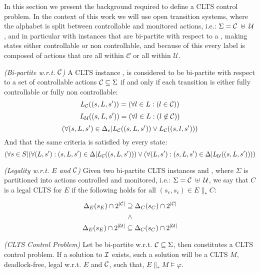 In this section we present the background required to define a CLTS control problem.  In the context of this work we will use open transition systems, where the alphabet is split between controllable and monitored actions, i.e.: $\Sigma=\mathcal{C} \; \uplus \;\mathcal{U}$, and in particular with instances that are bi-partite with respect to a \controlSet, making states either controllable or non controllable, and because of this every label is composed of actions that are all within $\mathcal{C}$ or all within $\mathcal{U}$. 

\begin{definition}\label{def:bi-partite_clts} \emph{(Bi-partite w.r.t. $\mathcal{C}$)} 
A CLTS instance \cltsDef, is considered to be bi-partite with respect to a set of controllable actions $\mathcal{C} \subseteq \Sigma$ if and only if each transition is either fully controllable or fully non controllable:
\[ L_{\mathcal{C}}((s,L,s'))= ( \forall l \in L:(l \in \mathcal{C}))\]
\[ L_{\mathcal{U}}((s,L,s'))= ( \forall l \in L:(l \not\in \mathcal{C}))\]
\[ (\forall (s,L,s') \in \Delta_e| L_{\mathcal{C}}((s,L,s')) \vee L_{\mathcal{C}}((s,l,s'))) \]
And that the same criteria is satisfied by every state:
\[ (\forall s \in S | (\forall (L, s'): (s,L,s') \in \Delta|L_{\mathcal{C}}((s,L,s')))\vee (\forall (L, s'): (s,L,s') \in \Delta|L_{\mathcal{U}}((s,L,s'))))\]
\end{definition}

\begin{definition}
	\label{def:legal_clts} \emph{(Legality w.r.t. $E$ and $\mathcal{C}$)} 
	Given two bi-partite CLTS instances  and , where $\Sigma$ is partitioned into actions controlled and monitored, i.e.: $\Sigma=\mathcal{C} \; \uplus \;\mathcal{U}$, we say that $C$ is a legal CLTS for $E$ if the following holds for all $(s_e,s_c) \in E \parallel_* C$:
	
	\[ \Delta_{E}(s_E)\cap 2^{|\mathcal{C}|} \supseteq \Delta_{C}(s_C)\cap 2^{|\mathcal{C}|}\] 
	\[\wedge\]
	\[\Delta_{E}(s_E)\cap 2^{|\mathcal{U}|} \subseteq \Delta_{C}(s_C)\cap 2^{|\mathcal{U}|} \]
\end{definition}

\begin{definition}
	\label{def:clts_control_problem} \emph{(CLTS Control Problem)} 
	Let  be bi-partite w.r.t. $\mathcal{C} \subseteq \Sigma$, then \controlProblemDef constitutes a CLTS control problem. If a solution to $\mathcal{I}$ exists, such a solution will be a CLTS $M$, deadlock-free, legal w.r.t. $E$ and $\mathcal{C}$, such that, $E \parallel_* M \models \varphi$.
\end{definition}
